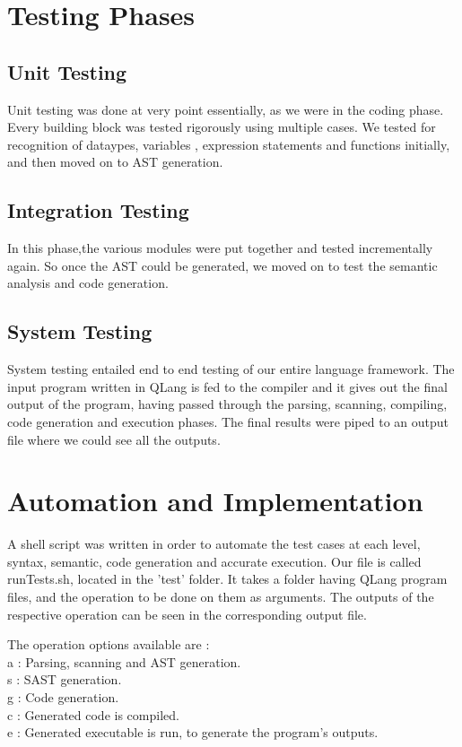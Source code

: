 \section{Testing Phases}

\subsection{Unit Testing}
Unit testing was done at very point essentially, as we were in the coding phase. Every building block was tested rigorously using multiple cases. We tested for recognition of dataypes, variables , expression statements and functions initially, and then moved on to AST generation.

\subsection{Integration Testing}
In this phase,the various modules were put together and tested incrementally again. So once the AST could be generated, we moved on to test the semantic analysis and code generation.

\subsection{System Testing}
System testing entailed end to end testing of our entire language framework. The input program written in QLang is fed to the compiler and it gives out the final output of the program, having passed through the parsing, scanning, compiling, code generation and execution phases. The final results were piped to an output file where we could see all the outputs.


\section{Automation and Implementation}
A shell script was written in order to automate the test cases at each level, syntax, semantic, code
generation and accurate execution. 
Our file is called runTests.sh, located in the 'test' folder. It takes a folder having QLang program files, and the operation to be done on them as arguments. The outputs of the respective operation can be seen in the corresponding output file. 


The operation options available are :\\
a : Parsing, scanning and AST generation. \\
s : SAST generation.\\
g : Code generation.\\
c : Generated code is compiled.\\
e : Generated executable is run, to generate the program's outputs.\\ 

